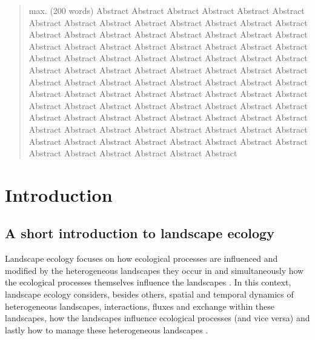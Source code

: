 \documentclass[smallextended]{svjour3}       %
\begin{document}
\begin{abstract}
max. (200 words) Abstract Abstract Abstract Abstract Abstract Abstract
Abstract Abstract Abstract Abstract Abstract Abstract Abstract Abstract
Abstract Abstract Abstract Abstract Abstract Abstract Abstract Abstract
Abstract Abstract Abstract Abstract Abstract Abstract Abstract Abstract
Abstract Abstract Abstract Abstract Abstract Abstract Abstract Abstract
Abstract Abstract Abstract Abstract Abstract Abstract Abstract Abstract
Abstract Abstract Abstract Abstract Abstract Abstract Abstract Abstract
Abstract Abstract Abstract Abstract Abstract Abstract Abstract Abstract
Abstract Abstract Abstract Abstract Abstract Abstract Abstract Abstract
Abstract Abstract Abstract Abstract Abstract Abstract Abstract Abstract
Abstract Abstract Abstract Abstract Abstract Abstract Abstract Abstract
Abstract Abstract Abstract Abstract Abstract Abstract Abstract Abstract
Abstract Abstract Abstract Abstract Abstract Abstract
\\


\end{abstract}


\def\spacingset#1{\renewcommand{\baselinestretch}%
{#1}\small\normalsize} \spacingset{1}


\hypertarget{sec:intro}{%
\section{Introduction}\label{sec:intro}}

\hypertarget{sec:landscape_ecology}{%
\subsection{A short introduction to landscape
ecology}\label{sec:landscape_ecology}}

Landscape ecology focuses on how ecological processes are influenced and
modified by the heterogeneous landscapes they occur in and
simultaneously how the ecological processes themselves influence the
landscapes \cite{Turner1989,Turner2005,With2019}. In this context,
landscape ecology considers, besides others, spatial and temporal
dynamics of heterogeneous landscapes, interactions, fluxes and exchange
within these landscapes, how the landscapes influence ecological
processes (and vice versa) and lastly how to manage these heterogeneous
landscapes \cite{Risser1984,Turner1989}.
\end{document}
